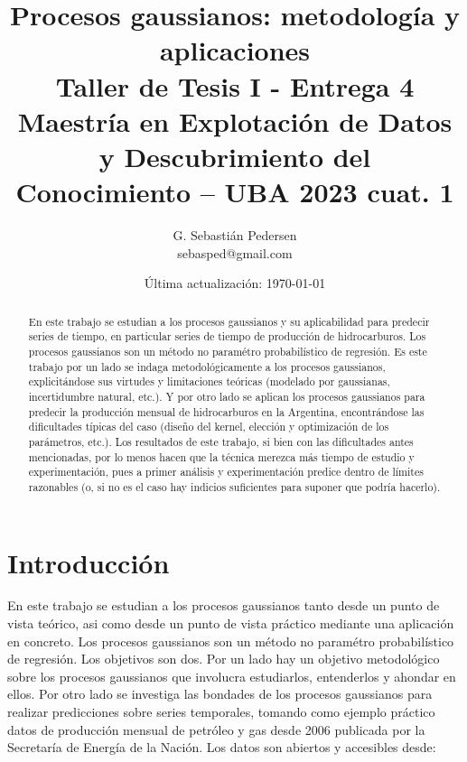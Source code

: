 \documentclass[a4paper]{article}
\title{Procesos gaussianos: metodología y aplicaciones\\ Taller de Tesis I - Entrega 4\\ Maestría en Explotación de Datos y Descubrimiento del Conocimiento -- UBA 2023 cuat. 1}%
\author{G. Sebastián Pedersen \\ {\small sebasped@gmail.com}}
\date{Última actualización: \today}
\begin{document}

	
\maketitle


	\begin{abstract}
		En este trabajo se estudian a los procesos gaussianos y su aplicabilidad para predecir series de tiempo, en particular series de tiempo de producción de hidrocarburos. Los procesos gaussianos son un método no paramétro probabilístico de regresión. Es este trabajo por un lado se indaga metodológicamente a los procesos gaussianos, explicitándose sus virtudes y limitaciones teóricas (modelado por gaussianas, incertidumbre natural, etc.). Y por otro lado se aplican los procesos gaussianos para predecir la producción mensual de hidrocarburos en la Argentina, encontrándose las dificultades típicas del caso (diseño del kernel, elección y optimización de los parámetros, etc.). Los resultados de este trabajo, si bien con las dificultades antes mencionadas, por lo menos hacen que la técnica merezca más tiempo de estudio y experimentación, pues a primer análisis y experimentación predice dentro de límites razonables (o, si no es el caso hay indicios suficientes para suponer que podría hacerlo).
	\end{abstract}

\tableofcontents


\newpage
\section{Introducción}
\label{sec:introd}

En este trabajo se estudian a los procesos gaussianos tanto desde un punto de vista teórico, asi como desde un punto de vista práctico mediante una aplicación en concreto. Los procesos gaussianos son un método no paramétro probabilístico de regresión. Los objetivos son dos. Por un lado hay un objetivo metodológico sobre los procesos gaussianos que involucra estudiarlos, entenderlos y ahondar en ellos. Por otro lado se investiga las bondades de los procesos gaussianos para realizar predicciones sobre series temporales, tomando como ejemplo práctico datos de producción mensual de petróleo y gas desde 2006 publicada por la Secretaría de Energía de la Nación. Los datos son abiertos y accesibles desde:\\
\end{document}
